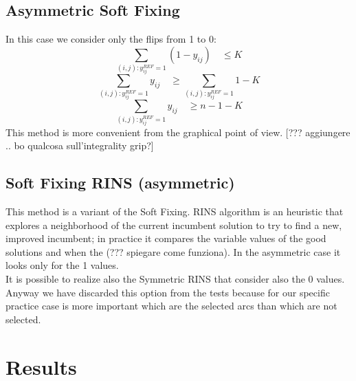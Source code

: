 \subsection{Asymmetric Soft Fixing}
In this case we consider only the flips from 1 to 0:
\[
	\sum_{(i,j):y^{REF}_{ij}=1} (1-y_{ij}) \quad \leq K
\]
\[
	\sum_{(i,j):y^{REF}_{ij}=1} y_{ij} \quad \geq \sum_{(i,j):y^{REF}_{ij}=1} 1 - K
\]
\[
	\sum_{(i,j):y^{REF}_{ij}=1} y_{ij} \quad \geq n - 1 - K
\]
This method is more convenient from the graphical point of view. 
[??? aggiungere .. bo qualcosa sull'integrality grip?]
\subsection{Soft Fixing RINS (asymmetric)}
This method is a variant of the Soft Fixing. RINS algorithm is an heuristic that explores a neighborhood of the current incumbent solution to try to find a new, improved incumbent; in practice it compares the variable values of the good solutions and when the (??? spiegare come funziona). In the asymmetric case it looks only for the 1 values. \\
It is possible to realize also the Symmetric RINS that consider also the 0 values. Anyway we have discarded this option from the tests because for our specific practice case is more important which are the selected arcs than which are not selected.
\section{Results}


